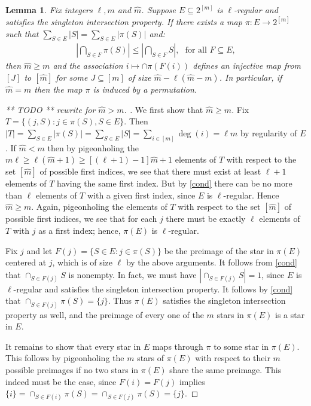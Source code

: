 \documentclass[9pt,twocolumn]{pnas-new}
\newtheorem{lemma}{Lemma}
\begin{document}
\begin{lemma}\label{NonEmptyLemma} 
Fix integers $\ell, m$ and $\hat m$. Suppose $E \subseteq 2^{[m]}$ is $\ell$-regular and satisfies the singleton intersection property. If there exists a map $\pi: E \to 2^{[\hat m]}$ such that $\sum_{S \in E} |S| = \sum_{S \in E} |\pi(S)|$ and:
\begin{align}\label{cond}
|\bigcap_{S \in F} \pi(S)| \leq |\bigcap_{S \in F} S |,\ \ \   \text{for all } F \subseteq E,
\end{align}
%
then $\hat m \geq m$ and the association $i \mapsto \cap \pi(F(i))$ defines an injective map from $[J]$ to $[\hat m]$ for some $J \subseteq [m]$ of size $\hat m - \ell(\hat m - m)$. In particular, if $\hat m = m$ then the map $\pi$ is induced by a permutation.
\end{lemma}
\begin{proof}
[ ** TODO ** rewrite for $\hat m > m$. ]
We first show that $\hat m \geq m$. Fix $T = \{(j, S): j \in \pi(S), S \in E\}$. Then $|T| = \sum_{S \in E} |\pi(S)| = \sum_{S \in E} |S| = \sum_{i \in [m]} \deg(i) = \ell m$ by regularity of $E$. If $\hat m < m$ then by pigeonholing the $m \ell \geq \ell (\hat m + 1) \geq [(\ell + 1) - 1] \hat m + 1$ elements of $T$ with respect to the set $[\hat m]$ of possible first indices, we see that there must exist at least $\ell + 1$ elements of $T$ having the same first index. But by \eqref{cond} there can be no more than $\ell$ elements of $T$ with a given first index, since $E$ is $\ell$-regular. Hence $\hat m \geq m$. Again, pigeonholing the elements of $T$ with respect to the set $[\hat m]$ of possible first indices, we see that for each $j$ there must be exactly $\ell$ elements of $T$ with $j$ as a first index; hence, $\pi(E)$ is $\ell$-regular. 

Fix $j$ and let $F(j) = \{S \in E: j \in \pi(S)\}$ be the preimage of the star in $\pi(E)$ centered at $j$, which is of size $\ell$ by the above arguments. It follows from \eqref{cond} that $\cap_{S \in F(j)} S$ is nonempty. In fact, we must have $|\cap _{S \in F(j)} S| = 1$, since $E$ is $\ell$-regular and satisfies the singleton intersection property. It follows by \eqref{cond} that $\cap_{S \in F(j)} \pi(S) = \{j\}$. Thus $\pi(E)$ satisfies the singleton intersection property as well, and the preimage of every one of the $m$ stars in $\pi(E)$ is a star in $E$.

It remains to show that every star in $E$ maps through $\pi$ to some star in $\pi(E)$. This follows by pigeonholing the $m$ stars of $\pi(E)$ with respect to their $m$ possible preimages if no two stars in $\pi(E)$ share the same preimage. This indeed must be the case, since $F(i) = F(j)$ implies $\{i\} = \cap_{S \in F(i)} \pi(S) = \cap_{S \in F(j)} \pi(S) = \{j\}$.
\end{proof}
\end{document}
